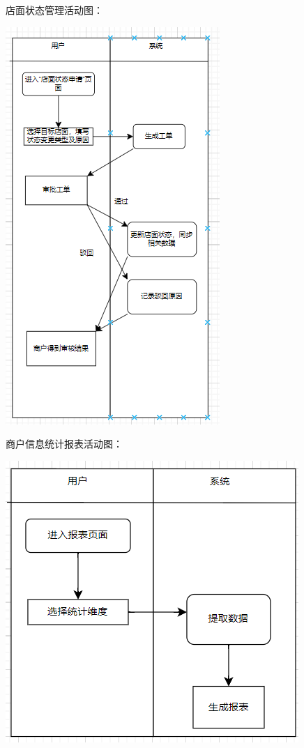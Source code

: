 \documentclass[]{article}
\let\oldincludegraphics\includegraphics
\renewcommand{\includegraphics}[2][]{%
  \begin{center}\oldincludegraphics[#1]{#2}\end{center}%
}
\begin{document}
店面状态管理活动图：
\includegraphics{media/2.7/image29.png}

商户信息统计报表活动图：
\includegraphics{media/2.7/image30.png}
\end{document}
